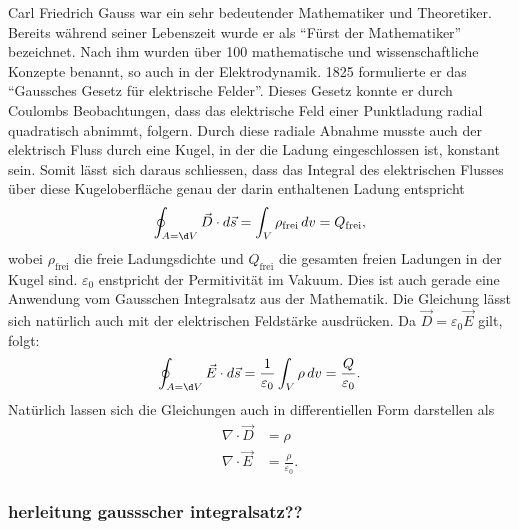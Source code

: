 Carl Friedrich Gauss war ein sehr bedeutender Mathematiker und Theoretiker.
Bereits während seiner Lebenszeit wurde er als ``Fürst der Mathematiker'' bezeichnet.
Nach ihm wurden über 100 mathematische und wissenschaftliche Konzepte benannt, so auch in der Elektrodynamik.\cite{maxwell:Carl_Friedrich_Gauß}
1825 formulierte er das ``Gaussches Gesetz für elektrische Felder''.
Dieses Gesetz konnte er durch Coulombs Beobachtungen, dass das elektrische Feld einer Punktladung radial quadratisch abnimmt, folgern.
Durch diese radiale Abnahme musste auch der elektrisch Fluss durch eine Kugel, in der die Ladung eingeschlossen ist, konstant sein.
Somit lässt sich daraus schliessen, dass das Integral des elektrischen Flusses über diese Kugeloberfläche genau der darin enthaltenen Ladung entspricht\cite{maxwell:Gaußscher_Integralsatz}
\[
\oint_{A=\d V} \vec{D} \cdot d\vec{s}
=
\int_{V} \rho_{\text{frei}}\, dv
=
Q_{\text{frei}} ,
\]
wobei $\rho_{\text{frei}}$ die freie Ladungsdichte und $Q_{\text{frei}}$ die gesamten freien Ladungen in der Kugel sind. $\varepsilon_0$ enstpricht der Permitivität im Vakuum. Dies ist auch gerade eine Anwendung vom Gausschen Integralsatz aus der Mathematik.
Die Gleichung lässt sich natürlich auch mit der elektrischen Feldstärke ausdrücken. Da $\vec{D} = \varepsilon_0 \vec{E}$ gilt, folgt:
\[
\oint_{A=\d V} \vec{E} \cdot d\vec{s}
=
\frac{1}{\varepsilon_0}\int_{V} \rho\, dv
=
\frac{Q}{\varepsilon_0} .
\]
Natürlich lassen sich die Gleichungen auch in differentiellen Form darstellen als
\begin{align*}
	\nabla \cdot \vec{D}
	&=
	\rho
	\\
	\nabla \cdot \vec{E}
	&=
	\frac{\rho}{\varepsilon_0} .
\end{align*}

\subsubsection{herleitung gaussscher integralsatz??}

